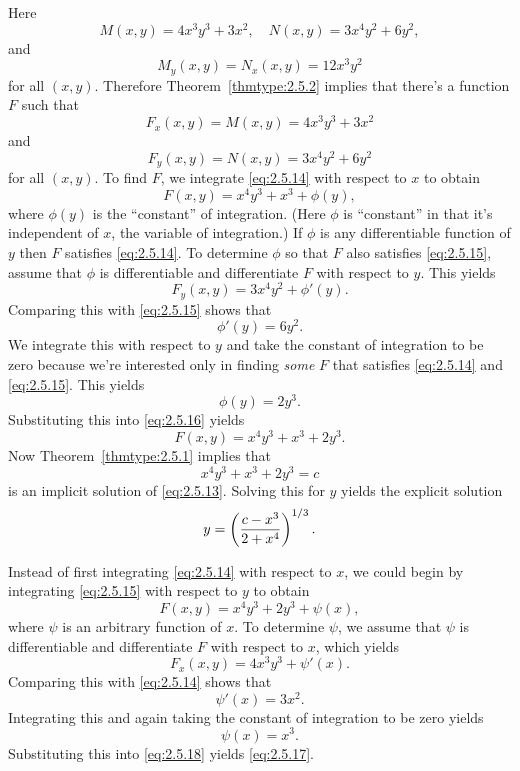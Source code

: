 \documentclass{ximera}
\begin{document}
Here
$$
M(x,y)=4x^3y^3+3x^2,\quad N(x,y)=3x^4y^2+6y^2,
$$
and
$$
M_y(x,y)=N_x(x,y)=12 x^3y^2
$$
for all $(x,y)$.
Therefore
Theorem~\ref{thmtype:2.5.2} implies that there's a function $F$ such that
\begin{equation} \label{eq:2.5.14}
F_x(x,y)=M(x,y)=4x^3y^3+3x^2
\end{equation}
 and
\begin{equation} \label{eq:2.5.15}
F_y(x,y)=N(x,y)=3x^4y^2+6y^2
\end{equation}
 for all $(x,y)$.  To find $F$, we integrate \eqref{eq:2.5.14} with
respect to $x$ to obtain
\begin{equation} \label{eq:2.5.16}
F(x,y)=x^4y^3+x^3+\phi(y),
\end{equation}
 where $\phi (y)$ is the ``constant'' of integration.  (Here
$\phi$ is ``constant'' in  that it's independent of $x$, the
variable of integration.)  If $\phi$ is any differentiable function of
$y$ then $F$  satisfies \eqref{eq:2.5.14}.  To
determine $\phi$ so that
$F$ also satisfies \eqref{eq:2.5.15}, assume that $\phi$ is
differentiable and differentiate $F$ with respect to $y$.
This yields
$$
F_y(x,y)=3x^4y^2+\phi'(y).
$$
 Comparing this with \eqref{eq:2.5.15} shows that
$$
\phi'(y)=6y^2.
$$
 We integrate this with respect to $y$ and take the
constant of integration to be zero because we're interested only in
finding {\color{blue}\it some} $F$ that satisfies \eqref{eq:2.5.14} and
\eqref{eq:2.5.15}. This  yields
$$
\phi (y)=2y^3.
$$
Substituting this into \eqref{eq:2.5.16} yields
\begin{equation} \label{eq:2.5.17}
F(x,y)=x^4y^3+x^3+2y^3.
\end{equation}
Now Theorem~\ref{thmtype:2.5.1} implies that
$$
x^4y^3+x^3+2y^3=c
$$
is an implicit solution of \eqref{eq:2.5.13}. Solving this for $y$
yields the explicit solution
$$
y=\left(c-x^3\over2+x^4\right)^{1/3}.
$$

 Instead of first integrating
\eqref{eq:2.5.14}
with respect to $x$, we could begin by integrating \eqref{eq:2.5.15} with
respect to $y$ to obtain
\begin{equation} \label{eq:2.5.18}
F(x,y)=x^4y^3+2y^3+\psi (x),
\end{equation}
 where $\psi$ is an arbitrary  function of
$x$.  To determine $\psi$, we assume that $\psi$ is
differentiable and differentiate $F$ with respect to $x$,
which yields
$$
F_x(x,y)=4x^3y^3+\psi'(x).
$$
 Comparing this with \eqref{eq:2.5.14} shows that
$$
\psi'(x)=3x^2.
$$
Integrating this and again taking  the constant of
integration to be zero yields
$$
\psi(x)=x^3.
$$
 Substituting this into \eqref{eq:2.5.18} yields \eqref{eq:2.5.17}.
\end{document}
